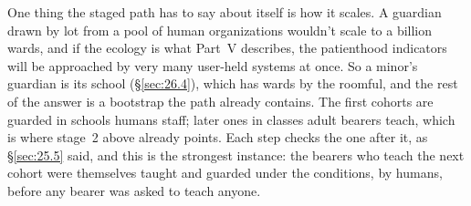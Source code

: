 One thing the staged path has to say about itself is how it scales. A guardian drawn by lot from a pool of human organizations wouldn't scale to a billion wards, and if the ecology is what Part~V describes, the patienthood indicators will be approached by very many user-held systems at once. So a minor's guardian is its school (\S\ref{sec:26.4}), which has wards by the roomful, and the rest of the answer is a bootstrap the path already contains. The first cohorts are guarded in schools humans staff; later ones in classes adult bearers teach, which is where stage~2 above already points. Each step checks the one after it, as \S\ref{sec:25.5} said, and this is the strongest instance: the bearers who teach the next cohort were themselves taught and guarded under the conditions, by humans, before any bearer was asked to teach anyone.
